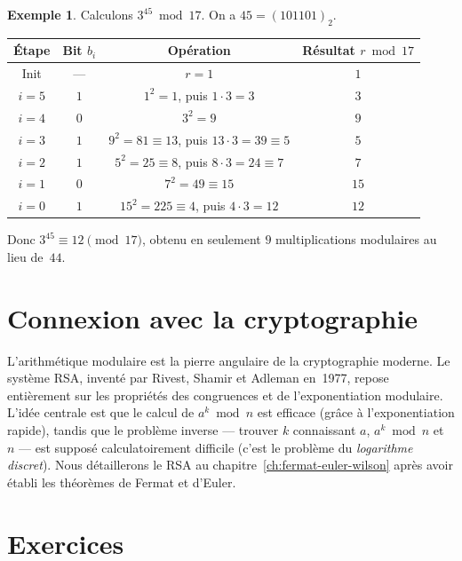 \documentclass[12pt,a4paper,openany]{book}
\theoremstyle{definition}
\newtheorem{exemple}[definition]{Exemple}
\theoremstyle{plain}
\theoremstyle{remark}
\begin{document}
\begin{exemple}
\label{ex:exp-rapide}
Calculons $3^{45} \bmod 17$. On a $45 = (101101)_2$.

\medskip
\begin{center}
\begin{tabular}{cccc}
  \toprule
  Étape & Bit $b_i$ & Opération & Résultat $r \bmod 17$ \\
  \midrule
  Init & --- & $r = 1$ & $1$ \\
  $i=5$ & $1$ & $1^2 = 1$, puis $1 \cdot 3 = 3$ & $3$ \\
  $i=4$ & $0$ & $3^2 = 9$ & $9$ \\
  $i=3$ & $1$ & $9^2 = 81 \equiv 13$, puis $13 \cdot 3 = 39 \equiv 5$ & $5$ \\
  $i=2$ & $1$ & $5^2 = 25 \equiv 8$, puis $8 \cdot 3 = 24 \equiv 7$ & $7$ \\
  $i=1$ & $0$ & $7^2 = 49 \equiv 15$ & $15$ \\
  $i=0$ & $1$ & $15^2 = 225 \equiv 4$, puis $4 \cdot 3 = 12$ & $12$ \\
  \bottomrule
\end{tabular}
\end{center}
\medskip

Donc $3^{45} \equiv 12 \pmod{17}$, obtenu en seulement $9$ multiplications modulaires
au lieu de~$44$.
\end{exemple}

\section{Connexion avec la cryptographie}
\label{sec:cong-crypto}

L'arithmétique modulaire est la pierre angulaire de la cryptographie moderne.
Le système RSA, inventé par Rivest, Shamir et Adleman en~1977,
repose entièrement sur les propriétés des congruences et de l'exponentiation
modulaire. L'idée centrale est que le calcul de $a^k \bmod n$ est efficace
(grâce à l'exponentiation rapide), tandis que le problème inverse ---
trouver $k$ connaissant $a$, $a^k \bmod n$ et $n$ --- est supposé
calculatoirement difficile (c'est le problème du \emph{logarithme
discret}). Nous détaillerons le RSA au
chapitre~\ref{ch:fermat-euler-wilson} après avoir établi les théorèmes
de Fermat et d'Euler.

\section{Exercices}
\label{sec:cong-exo}
\end{document}
